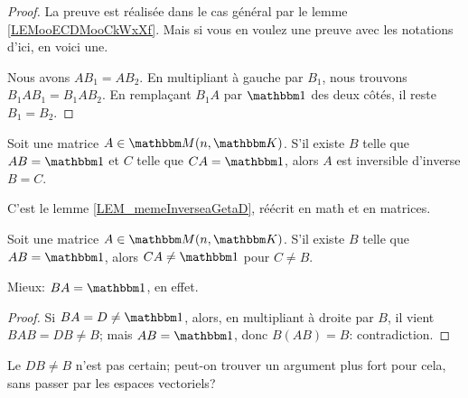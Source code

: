 \begin{proof}
    La preuve est réalisée dans le cas général par le lemme \ref{LEMooECDMooCkWxXf}. Mais si vous en voulez une preuve avec les notations d'ici, en voici une.

    Nous avons $AB_1=AB_2$. En multipliant à gauche par \( B_1\), nous trouvons \( B_1AB_1=B_1AB_2\). En remplaçant \( B_1A\) par \( \mtu\) des deux côtés, il reste \( B_1=B_2\).
\end{proof}

\begin{lemma}
  Soit une matrice \( A\in \eM(n,\eK)\). S'il existe \( B \) telle que \( AB = \mtu \) et \( C \) telle que \( CA = \mtu \), alors \( A \) est inversible d'inverse \( B = C \).
\end{lemma}
C'est le lemme \ref{LEM_memeInverseaGetaD}, réécrit en math et en matrices.

\begin{corollary}\label{PROPooECIIooVMCIwz}
  Soit une matrice \( A\in \eM(n,\eK)\). S'il existe \( B \) telle que \( AB = \mtu \), alors \( CA \neq \mtu \) pour \( C \neq B \).
  
  Mieux: \( BA = \mtu \), en effet.
\end{corollary}
\begin{proof}
  Si \( BA = D \neq \mtu \), alors, en multipliant à droite par \( B \), il vient \( BAB = DB \neq B \); mais \( AB = \mtu \), donc \( B(AB) = B \): contradiction. 
\end{proof}


\begin{probleme}
  Le $DB \neq B$ n'est pas certain; peut-on trouver un argument plus fort pour cela, sans passer par les espaces vectoriels?
\end{probleme}

